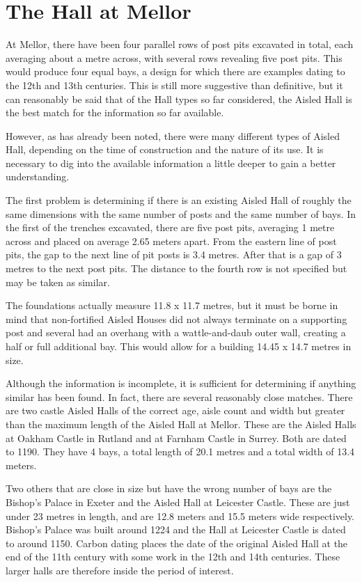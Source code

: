\documentclass[letterpaper,11pt,titlepage]{article}
\begin{document}
{\section{The Hall at Mellor}
At Mellor, there have been four parallel rows of post pits excavated in total, each averaging about a metre across, with several rows revealing five post pits.  This would produce four equal bays, a design for which there are examples dating to the 12th and 13th centuries. This is still more suggestive than definitive, but it can reasonably be said that of the Hall types so far considered, the Aisled Hall is the best match for the information so far available.

However, as has already been noted, there were many different types of Aisled Hall, depending on the time of construction and the nature of its use. It is necessary to dig into the available information a little deeper to gain a better understanding. 

The first problem is determining if there is an existing Aisled Hall of roughly the same dimensions with the same number of posts and the same number of bays. In the first of the trenches excavated, there are five post pits, averaging 1 metre across and placed on average 2.65 meters apart. From the eastern line of post pits, the gap to the next line of pit posts is 3.4 metres. After that is a gap of 3 metres to the next post pits. The distance to the fourth row is not specified but may be taken as similar.

The foundations actually measure 11.8 x 11.7 metres, but it must be borne in mind that non-fortified Aisled Houses did not always terminate on a supporting post and several had an overhang with a wattle-and-daub outer wall, creating a half or full additional bay. This would allow for a building 14.45 x 14.7 metres in size.

Although the information is incomplete, it is sufficient for determining if anything similar has been found. In fact, there are several reasonably close matches. There are two castle Aisled Halls of the correct age, aisle count and width but greater than the maximum length of the Aisled Hall at Mellor. These are the Aisled Halls at Oakham Castle in Rutland and at Farnham Castle in Surrey. Both are dated to 1190. They have 4 bays, a total length of 20.1 metres and a total width of 13.4 meters.

Two others that are close in size but have the wrong number of bays are the Bishop's Palace in Exeter and the Aisled Hall at Leicester Castle. These are just under 23 metres in length, and are 12.8 meters and 15.5 meters wide respectively. Bishop's Palace was built around 1224 and the Hall at Leicester Castle is dated to around 1150.
Carbon dating places the date of the original Aisled Hall at the end of the 11th century with some work in the 12th and 14th centuries. These larger halls are therefore inside the period of interest.

}
\end{document}
